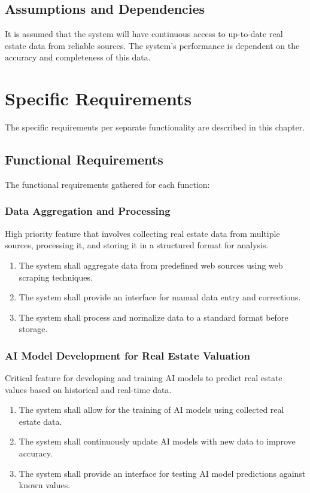 \documentclass[12pt]{article}
\begin{document}
\subsection{Assumptions and Dependencies}
It is assumed that the system will have continuous access to up-to-date real estate data from reliable sources. The system's performance is dependent on the accuracy and completeness of this data.

\newpage

\section{Specific Requirements}
The specific requirements per separate functionality are described in this chapter.
\subsection{Functional Requirements}
The functional requirements gathered for each function:
\subsubsection{Data Aggregation and Processing}
High priority feature that involves collecting real estate data from multiple sources, processing it, and storing it in a structured format for analysis.
\begin{enumerate}
    \item  The system shall aggregate data from predefined web sources using web scraping techniques.
    \item The system shall provide an interface for manual data entry and corrections.
    \item The system shall process and normalize data to a standard format before storage.
\end{enumerate}

\subsubsection{AI Model Development for Real Estate Valuation}
Critical feature for developing and training AI models to predict real estate values based on historical and real-time data.
\begin{enumerate}
    \item The system shall allow for the training of AI models using collected real estate data.
    \item The system shall continuously update AI models with new data to improve accuracy.
    \item The system shall provide an interface for testing AI model predictions against known values.
\end{enumerate}
\end{document}
